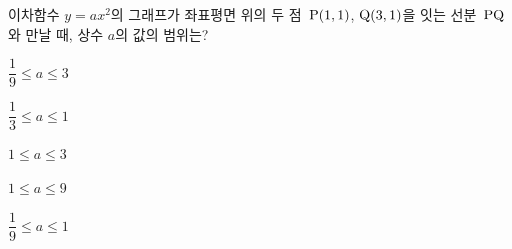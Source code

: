 이차함수 $y=ax^2$의 그래프가 좌표평면 위의 두 점~$\mathrm{P}(1{,}\mkern3mu 1)$, $\mathrm{Q}(3{,}\mkern3mu 1)$을 잇는 선분~$\mathrm{PQ}$와 만날 때, 상수 $a$의 값의 범위는?
\begin{choices32}{\rule[-3ex]{0pt}{8ex}$\dfrac{1}{9}\le a\le 3$}{\rule[-3ex]{0pt}{8ex}$\dfrac{1}{3}\le a\le 1$}{\rule[-3ex]{0pt}{8ex}$1\le a\le 3$}{\rule[-3ex]{0pt}{8ex}$1\le a\le 9$}{\rule[-3ex]{0pt}{8ex}$\dfrac{1}{9}\le a\le 1$}\end{choices32}
